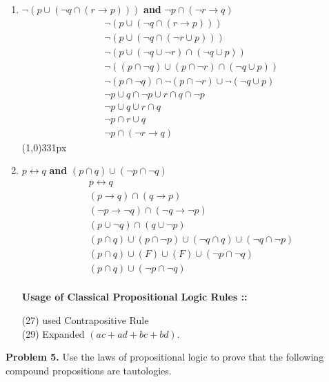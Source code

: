 \documentclass[11pt]{article}
\begin{document}
\begin{enumerate}[label=4.\arabic* ::]
\item
$\neg (p\cup (\neg q\cap (r\rightarrow p)))$ \textbf{and} $\neg p\cap 
(\neg r\rightarrow q)$
\begin{align}
    &\neg (p\cup (\neg q\cap (r\rightarrow p))) \\
    &\neg (p\cup (\neg q\cap (\neg r\cup p))) \\
    &\neg (p\cup (\neg q \cup\neg r)\cap (\neg q\cup p)) \\
    &\neg((p\cap\neg q)\cup(p\cap\neg r)\cap(\neg q\cup p)) \\
    &\neg(p\cap\neg q)\cap\neg(p\cap\neg r)\cup\neg(\neg q\cup p) \\
    &\neg p\cup q\cap\neg p\cup r\cap q \cap\neg p \\
    &\neg p\cup q\cup r\cap q \\
    &\neg p\cap r\cup q \\
    &\neg p\cap(\neg r\rightarrow q)
\end{align}
\line(1,0){331px}

\item
$p\leftrightarrow q$ \textbf{and} $(p\cap q)\cup(\neg p\cap\neg q)$
\begin{align}
    &p\leftrightarrow q \\
    &(p\rightarrow q)\cap(q\rightarrow p) \\
    &(\neg p\rightarrow\neg q)\cap(\neg q\rightarrow\neg p) \\
    &(p\cup\neg q)\cap(q\cup\neg p) \\
    &(p\cap q)\cup(p\cap\neg p)\cup(\neg q\cap q)\cup(\neg q\cap\neg p) \\
    &(p\cap q)\cup (F)\cup (F)\cup(\neg p\cap\neg q) \\
    &(p\cap q)\cup(\neg p\cap\neg q) \\
\end{align}

\textbf{Usage of Classical Propositional Logic Rules ::}

(27) used Contrapositive Rule\\
(29) Expanded $(ac+ad+bc+bd)$.
\pagebreak


\end{enumerate}

\pagebreak


\textbf{Problem 5.} Use the laws of propositional logic to prove that the following
compound propositions are tautologies.
\end{document}
